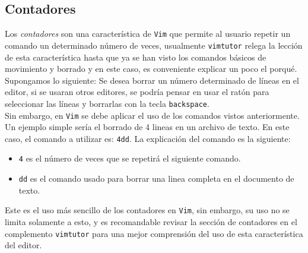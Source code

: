 \documentclass[10pt]{article}
\begin{document}
\subsection{Contadores}
Los \textit{contadores} son una característica de \texttt{Vim} que permite al usuario repetir un comando un determinado número de veces, usualmente \texttt{vimtutor} relega la lección de esta característica hasta que ya se han visto los comandos básicos de movimiento y borrado y en este caso, es conveniente explicar un poco el porqué. Supongamos lo siguiente: Se desea borrar un número determinado de líneas en el editor, si se usaran otros editores, se podría pensar en usar el ratón para seleccionar las líneas y borrarlas con la tecla \texttt{backspace}.\\
Sin embargo, en \texttt{Vim} se debe aplicar el uso de los comandos vistos anteriormente. Un ejemplo simple sería el borrado de 4 lineas en un archivo de texto. En este caso, el comando a utilizar es: \texttt{4dd}. La explicación del comando es la siguiente: 
\begin{itemize}
	\item \texttt{4} es el número de veces que se repetirá el siguiente comando. 
	\item \texttt{dd} es el comando usado para borrar una linea completa en el documento de texto. 
\end{itemize}
Este es el uso más sencillo de los contadores en \texttt{Vim}, sin embargo, su uso no se limita solamente a esto, y es recomandable revisar la sección de contadores en el complemento \texttt{vimtutor} para una mejor comprensión del uso de esta característica del editor. 
\end{document}
